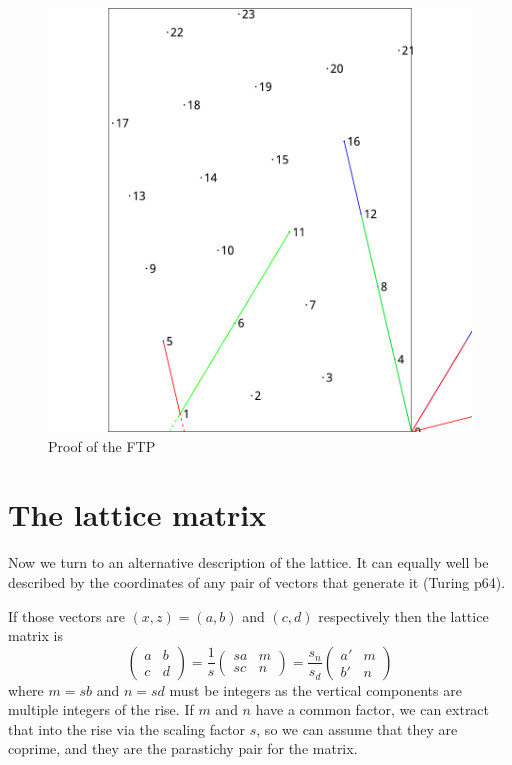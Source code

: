 \documentclass[a4paper]{article}
\begin{document}
\begin{center}
\begin{figure}[H]
\includegraphics{figdir/fig-ftpfig}
\caption{Proof of the FTP}
\label{fig:ftp}
\end{figure}
\end{center}



\section{The lattice matrix}

Now we turn to an alternative description of the lattice. It can equally well be described by the coordinates of any
pair of vectors that generate it (Turing p64).

If those vectors are $(x,z)=(a,b)$ and $(c,d)$ respectively then the lattice matrix
is
\[
	\left( \begin{array}{ll}
	a & b \\ c & d
\end{array} \right )
=
\frac{1}{s}\left( \begin{array}{ll}
	sa & m \\ sc & n
\end{array} \right )
=
\frac{s_n}{s_d}\left( \begin{array}{ll}
	a' & m \\ b' & n
\end{array} \right )
\]
where $m=sb$ and $n=sd$ must be integers as the vertical components are multiple integers of the rise.
If $m$ and $n$ have a common factor, we can extract that into the rise via the scaling factor $s$, so we
can assume that they are coprime, and they are the parastichy pair for the matrix.
\end{document}

